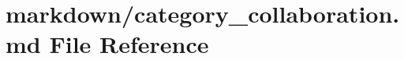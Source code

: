 \hypertarget{category__collaboration_8md}{}\section{markdown/category\+\_\+collaboration.md File Reference}
\label{category__collaboration_8md}
